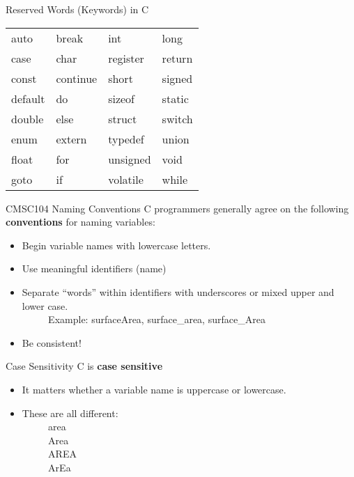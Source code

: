 \documentclass[graphics]{beamer}
\begin{document}
\begin{frame}{Reserved Words (Keywords) in C}
    \centering
    \begin{tabular}{l l l l}
        auto   & break     & int      & long   \\ [5pt]
        case    & char     & register & return \\ [5pt]
        const   & continue & short    & signed \\ [5pt]
        default & do       & sizeof   & static \\ [5pt]
        double  & else     & struct   & switch \\ [5pt]
        enum    & extern   & typedef  & union  \\ [5pt]
        float   & for      & unsigned & void   \\ [5pt]
        goto    & if       & volatile & while
    \end{tabular}
\end{frame}

\begin{frame}{CMSC104 Naming Conventions}
    C programmers generally agree on the following \textbf{conventions} for naming variables:
    \begin{itemize}
        \item Begin variable names with lowercase letters.
        \item Use meaningful identifiers (name)
        \item Separate ``words'' within identifiers with underscores or mixed upper and lower case. \\
        ~~ ~~ Example: surfaceArea, surface\_area, surface\_Area
        \item Be consistent!
    \end{itemize}
\end{frame}

\begin{frame}{Case Sensitivity}
    C is \textbf{case sensitive}
    \begin{itemize}
        \item It matters whether a variable name is uppercase or lowercase.
        \item These are all different: \\
        ~~ ~~ area \\
        ~~ ~~ Area \\
        ~~ ~~ AREA \\
        ~~ ~~ ArEa
    \end{itemize}
\end{frame}
\end{document}
